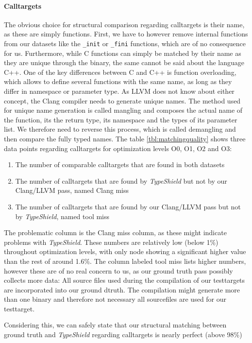 \paragraph {Calltargets} The obvious choice for structural comparison regarding calltargets is their name, as these are simply functions. First, we have to however remove internal functions from our datasets like the \texttt{\_init} or \texttt{\_fini} functions, which are of no consequence for us. Furthermore, while C functions can simply be matched by their name as they are unique through the binary, the same cannot be said about the language C++. One of the key differences between C and C++ is function overloading, which allows to define several functions with the same name, as long as they differ in namespace or parameter type. As LLVM does not know about either concept, the Clang compiler needs to generate unique names. The method used for unique name generation is called mangling and composes the actual name of the function, its the return type, its namespace and the types of its parameter list. We therefore need to reverse this process, which is called demangling and then compare the fully typed names.
The table \ref{tbl:matchingquality} shows three data points regarding calltargets for optimization levels O0, O1, O2 and O3:
\begin{enumerate}
\item The number of comparable calltargets that are found in both datasets
\item The number of calltargets that are found by \textit{TypeShield} but not by our Clang/LLVM pass, named Clang miss
\item The number of calltargets that are found by our Clang/LLVM pass but not by \textit{TypeShield}, named tool miss
\end{enumerate}
The problematic column is the Clang miss column, as these might indicate problems with \textit{TypeShield}. These numbers are relatively low (below 1\%) throughout optimization levels, with only node showing a significant higher value than the rest of around 1.6\%. The column labeled tool miss lists higher numbers, however these are of no real concern to us, as our ground truth pass possibly collects more data: All source files used during the compilation of our testtargets are incorporated into our ground dtruth. The compilation might generate more than one binary and therefore not necessary all sourcefiles are used for our testtarget.

Considering this, we can safely state that our structural matching between ground truth and \textit{TypeShield} regarding calltargets is nearly perfect (above 98\%)


